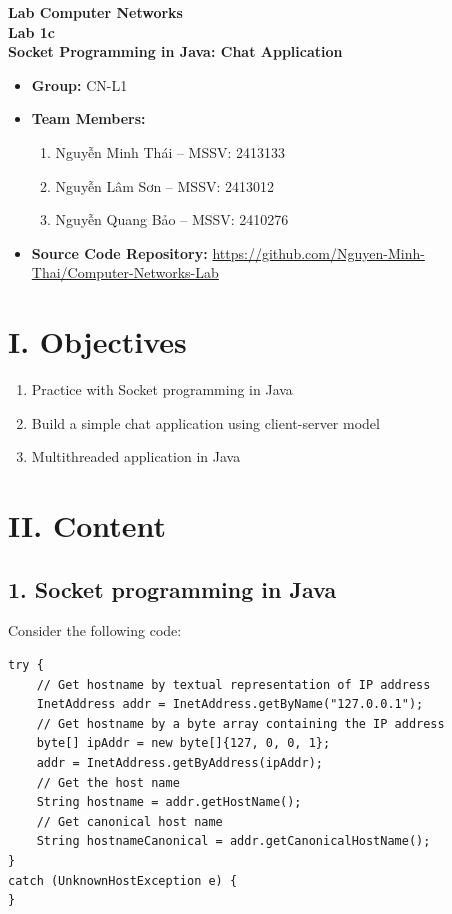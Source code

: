 \documentclass[11pt,a4paper]{article}
\begin{document}
\begin{center}
    {\large \textbf{Lab Computer Networks }}\\[2pt]
    {\large \textbf{Lab 1c}}\\[4pt]
    {\Large \textbf{Socket Programming in Java: Chat Application}}\\[12pt]
\end{center}

\noindent
\hline
\begin{itemize}
    \item \textbf{Group:} CN-L1
    \item \textbf{Team Members:}
    \begin{enumerate}
        \item Nguyễn Minh Thái -- MSSV: 2413133
        \item Nguyễn Lâm Sơn -- MSSV: 2413012
        \item Nguyễn Quang Bảo -- MSSV: 2410276
    \end{enumerate}
    \item \textbf{Source Code Repository:} \url{https://github.com/Nguyen-Minh-Thai/Computer-Networks-Lab}
\end{itemize}
\hline

\section*{I. Objectives}
\begin{enumerate}
    \item Practice with Socket programming in Java
    \item Build a simple chat application using client-server model
    \item Multithreaded application in Java
\end{enumerate}

\section*{II. Content}

\subsection*{1. Socket programming in Java}
\noindent Consider the following code:
\begin{lstlisting}
try {
    // Get hostname by textual representation of IP address
    InetAddress addr = InetAddress.getByName("127.0.0.1");
    // Get hostname by a byte array containing the IP address
    byte[] ipAddr = new byte[]{127, 0, 0, 1};
    addr = InetAddress.getByAddress(ipAddr);
    // Get the host name
    String hostname = addr.getHostName();
    // Get canonical host name
    String hostnameCanonical = addr.getCanonicalHostName();
}
catch (UnknownHostException e) {
}
\end{lstlisting}
\end{document}
